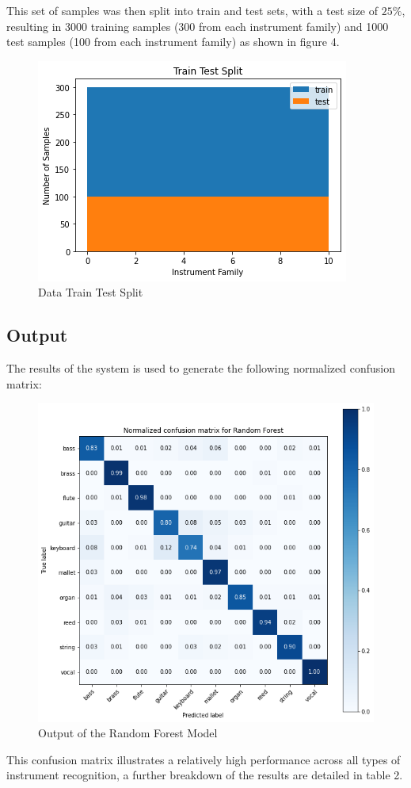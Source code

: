 \documentclass{article}
\begin{document}
This set of samples was then split into train and test sets, with a test size of $25\%$, resulting in 3000 training samples (300 from each instrument family) and 1000 test samples (100 from each instrument family) as shown in figure 4.

\begin{figure}[htb]
  \centering
  \includegraphics[width=.5\linewidth]{train_test_split}
  \caption{Data Train Test Split}
\end{figure}

\subsection{Output}
The results of the system is used to generate the following normalized confusion matrix:

\begin{figure}[htb]
  \centering
  \includegraphics[width=.7\linewidth]{confusion_matrix}
  \caption{Output of the Random Forest Model}
\end{figure}

This confusion matrix illustrates a relatively high performance across all types of instrument recognition, a further breakdown of the results are detailed in table 2. 
\end{document}
